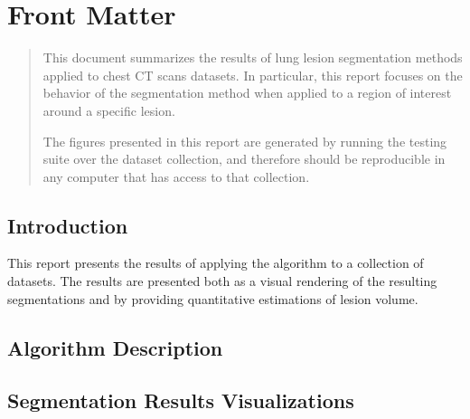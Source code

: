 \documentclass{InsightArticle}
\begin{document}
\maketitle

\ifhtml
\chapter*{Front Matter\label{front}}
\fi


\begin{abstract}
\noindent
This document summarizes the results of lung lesion segmentation methods
applied to chest CT scans datasets. In particular, this report focuses on the
behavior of the segmentation method when applied to a region of interest around
a specific lesion.

The figures presented in this report are generated by running the testing suite
over the dataset collection, and therefore should be reproducible in any
computer that has access to that collection.
\end{abstract}

\tableofcontents

\section{Introduction}

This report presents the results of applying the algorithm to a collection of
datasets. The results are presented both as a visual rendering of the resulting
segmentations and by providing quantitative estimations of lesion volume.

\section{Algorithm Description}

\section{Segmentation Results Visualizations}


\small
\listoffigures
\listoftables
\normalsize
\end{document}
